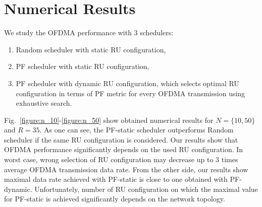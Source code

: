 \documentclass[conference]{IEEEtran}
\begin{document}
\section{Numerical Results}


We study the OFDMA performance with 3 schedulers:  

\begin{enumerate}
	\item Random scheduler with static RU configuration, 
	
	\item PF scheduler with static RU configuration,
	
	\item PF scheduler with dynamic RU configuration, which selects optimal RU configuration in terms of PF metric for every OFDMA transmission using exhaustive search.
\end{enumerate}


Fig.~\ref{figure:n_10}-\ref{figure:n_50} show obtained numerical results for $N = \{10,50\}$ and $R=35$. As one can see, the PF-static scheduler outperforms Random scheduler if the same RU configuration is considered. Our results show that OFDMA performance significantly depends on the used RU configuration. In worst case, wrong selection of RU configuration may decrease up to 3 times average OFDMA transmission data rate. From the other side, our results show maximal data rate achieved with PF-static is close to one obtained with PF-dynamic. Unfortunately, number of RU configuration on which the maximal value for PF-static is achieved significantly depends on the network topology.





%
%
%
\end{document}
